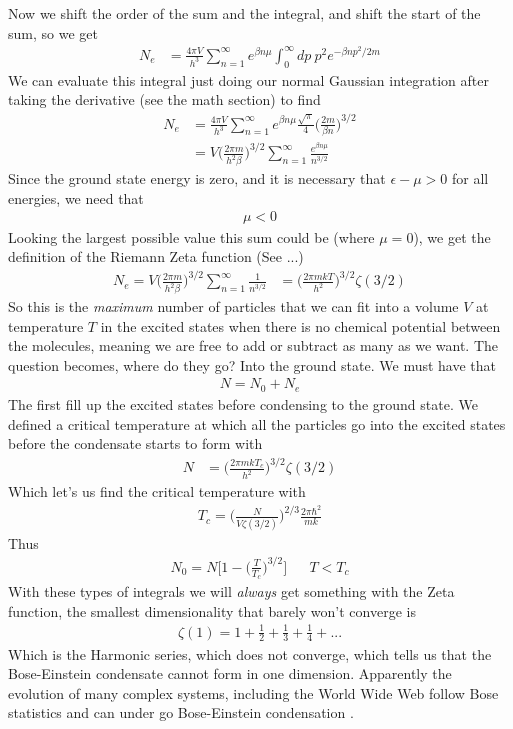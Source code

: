 Now we shift the order of the sum and the integral, and shift the start of the sum, so we get
\begin{align}
    N_e &= \frac{4\pi V}{h^3}\sum_{n=1}^\infty e^{\beta n\mu}\int_0^\infty dp~p^2  e^{-\beta n p^2/2m}
\end{align}
We can evaluate this integral just doing our normal Gaussian integration after taking the derivative (see the math section) to find
\begin{align}
    N_e &= \frac{4\pi V}{h^3}\sum_{n=1}^\infty e^{\beta n\mu} \frac{\sqrt{\pi}}{4}\Big(\frac{2m}{\beta n}\Big)^{3/2}\\
    &= V\Big(\frac{2\pi m}{h^2\beta}\Big)^{3/2}\sum_{n=1}^\infty \frac{e^{\beta n\mu}}{n^{3/2}}
\end{align}
Since the ground state energy is zero, and it is necessary that $\epsilon - \mu > 0$ for all energies, we need that
\begin{align}
    \mu < 0
\end{align}
Looking the largest possible value this sum could be (where $\mu = 0$), we get the definition of the Riemann Zeta function (See ...)
\begin{align}
    N_e = V\Big(\frac{2\pi m}{h^2\beta}\Big)^{3/2}\sum_{n=1}^\infty \frac{1}{n^{3/2}} &= \Big(\frac{2\pi m kT}{h^2}\Big)^{3/2} \zeta(3/2)
\end{align}
So this is the \emph{maximum} number of particles that we can fit into a volume $V$ at temperature $T$ in the excited states when there is no chemical potential between the molecules, meaning we are free to add or subtract as many as we want. The question becomes, where do they go? Into the ground state. We must have that 
\begin{align}
    N = N_0 + N_e
\end{align}
The first fill up the excited states before condensing to the ground state. We defined a critical temperature at which all the particles go into the excited states before the condensate starts to form with %
\begin{align}
    N &= \Big(\frac{2\pi m kT_c}{h^2}\Big)^{3/2} \zeta(3/2)
\end{align}
Which let's us find the critical temperature with
\begin{align}
    T_c = \Big(\frac{N}{V\zeta(3/2)}\Big)^{2/3} \frac{2\pi\hbar^2}{mk}
\end{align}
Thus
\begin{align}
    N_0 = N\Big[1-\Big(\frac{T}{T_c}\Big)^{3/2}\Big]&& T < T_c
\end{align}
With these types of integrals we will \emph{always} get something with the Zeta function, the smallest dimensionality that barely won't converge is 
\begin{align}
    \zeta(1) = 1 + \frac{1}{2} + \frac{1}{3} + \frac{1}{4} + ...
\end{align}
Which is the Harmonic series, which does not converge, which tells us that the Bose-Einstein condensate cannot form in one dimension. Apparently the evolution of many complex systems, including the World Wide Web follow Bose statistics and can under go Bose-Einstein condensation \cite{biancoli}.

